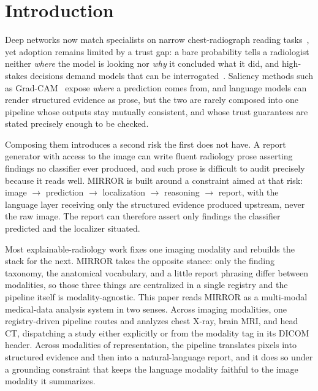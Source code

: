 \documentclass[conference]{IEEEtran}
\begin{document}
\section{Introduction}

Deep networks now match specialists on narrow chest-radiograph reading
tasks~\cite{rajpurkar2017chexnet}, yet adoption remains limited by a trust gap: a
bare probability tells a radiologist neither \emph{where} the model is looking nor
\emph{why} it concluded what it did, and high-stakes decisions demand models that
can be interrogated~\cite{rudin2019stop}. Saliency methods such as
Grad-CAM~\cite{selvaraju2017gradcam} expose \emph{where} a prediction comes from,
and language models can render structured evidence as prose, but the two are rarely
composed into one pipeline whose outputs stay mutually consistent, and whose trust
guarantees are stated precisely enough to be checked.

Composing them introduces a second risk the first does not have. A report
generator with access to the image can write fluent radiology prose asserting
findings no classifier ever produced, and such prose is difficult to audit
precisely because it reads well. MIRROR is built around a constraint aimed at that
risk: image $\rightarrow$ prediction $\rightarrow$ localization $\rightarrow$
reasoning $\rightarrow$ report, with the language layer receiving only the
structured evidence produced upstream, never the raw image. The report can
therefore assert only findings the classifier predicted and the localizer situated.

Most explainable-radiology work fixes one imaging modality and rebuilds the stack
for the next. MIRROR takes the opposite stance: only the finding taxonomy, the
anatomical vocabulary, and a little report phrasing differ between modalities, so
those three things are centralized in a single registry and the pipeline itself is
modality-agnostic. This paper reads MIRROR as a multi-modal medical-data analysis
system in two senses. Across imaging modalities, one registry-driven pipeline
routes and analyzes chest X-ray, brain MRI, and head CT, dispatching a study either
explicitly or from the modality tag in its DICOM header. Across modalities of
representation, the pipeline translates pixels into structured evidence and then
into a natural-language report, and it does so under a grounding constraint that
keeps the language modality faithful to the image modality it summarizes.
\end{document}
